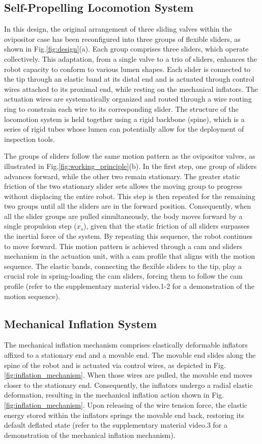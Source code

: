 \documentclass[letterpaper, 10 pt, conference]{ieeeconf}  %
\begin{document}
\subsection*{Self-Propelling Locomotion System}
In this design, the original arrangement of three sliding valves within the ovipositor case has been reconfigured into three groups of flexible sliders, as shown in Fig.\ref{fig:design}(a). Each group comprises three sliders, which operate collectively. This adaptation, from a single valve to a trio of sliders, enhances the robot capacity to conform to various lumen shapes. Each slider is connected to the tip through an elastic band at its distal end and is actuated through control wires attached to its proximal end, while resting on the mechanical inflators. The actuation wires are systematically organized and routed through a wire routing ring to constrain each wire to its corresponding slider. The structure of the locomotion system is held together using a rigid backbone (spine), which is a series of rigid tubes whose lumen can potentially allow for the deployment of inspection tools. 

The groups of sliders follow the same motion pattern as the ovipositor valves, as illustrated in Fig.\ref{fig:working_principle}(b). In the first step, one group of sliders advances forward, while the other two remain stationary. The greater static friction of the two stationary slider sets allows the moving group to progress without displacing the entire robot. This step is then repeated for the remaining two groups until all the sliders are in the forward position. Consequently, when all the slider groups are pulled simultaneously, the body moves forward by a single propulsion step ($x_{s}$), given that the static friction of all sliders surpasses the inertial force of the system. By repeating this sequence, the robot continues to move forward. This motion pattern is achieved through a cam and sliders mechanism in the actuation unit, with a cam profile that aligns with the motion sequence. The elastic bands, connecting the flexible sliders to the tip, play a crucial role in spring-loading the cam sliders, forcing them to follow the cam profile (refer to the supplementary material video.1-2 for a demonstration of the motion sequence). 

\subsection*{Mechanical Inflation System}
The mechanical inflation mechanism comprises elastically deformable inflators affixed to a stationary end and a movable end. The movable end slides along the spine of the robot and is actuated via control wires, as depicted in Fig.\ref{fig:inflation_mechanism}. When those wires are pulled, the movable end moves closer to the stationary end. Consequently, the inflators undergo a radial elastic deformation, resulting in the mechanical inflation action shown in Fig.\ref{fig:inflation_mechanism}. Upon releasing of the wire tension force, the elastic energy stored within the inflators springs the movable end back, restoring its default deflated state (refer to the supplementary material video.3 for a demonstration of the mechanical inflation mechanism). 
\end{document}
